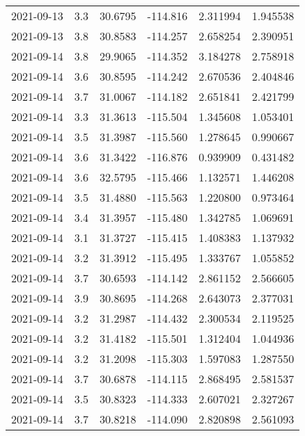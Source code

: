 \begin{tabular}{lrrrrr}
2021-09-13 &       3.3 &  30.6795 &  -114.816 &         2.311994 &         1.945538 \\
2021-09-13 &       3.8 &  30.8583 &  -114.257 &         2.658254 &         2.390951 \\
2021-09-14 &       3.8 &  29.9065 &  -114.352 &         3.184278 &         2.758918 \\
2021-09-14 &       3.6 &  30.8595 &  -114.242 &         2.670536 &         2.404846 \\
2021-09-14 &       3.7 &  31.0067 &  -114.182 &         2.651841 &         2.421799 \\
2021-09-14 &       3.3 &  31.3613 &  -115.504 &         1.345608 &         1.053401 \\
2021-09-14 &       3.5 &  31.3987 &  -115.560 &         1.278645 &         0.990667 \\
2021-09-14 &       3.6 &  31.3422 &  -116.876 &         0.939909 &         0.431482 \\
2021-09-14 &       3.6 &  32.5795 &  -115.466 &         1.132571 &         1.446208 \\
2021-09-14 &       3.5 &  31.4880 &  -115.563 &         1.220800 &         0.973464 \\
2021-09-14 &       3.4 &  31.3957 &  -115.480 &         1.342785 &         1.069691 \\
2021-09-14 &       3.1 &  31.3727 &  -115.415 &         1.408383 &         1.137932 \\
2021-09-14 &       3.2 &  31.3912 &  -115.495 &         1.333767 &         1.055852 \\
2021-09-14 &       3.7 &  30.6593 &  -114.142 &         2.861152 &         2.566605 \\
2021-09-14 &       3.9 &  30.8695 &  -114.268 &         2.643073 &         2.377031 \\
2021-09-14 &       3.2 &  31.2987 &  -114.432 &         2.300534 &         2.119525 \\
2021-09-14 &       3.2 &  31.4182 &  -115.501 &         1.312404 &         1.044936 \\
2021-09-14 &       3.2 &  31.2098 &  -115.303 &         1.597083 &         1.287550 \\
2021-09-14 &       3.7 &  30.6878 &  -114.115 &         2.868495 &         2.581537 \\
2021-09-14 &       3.5 &  30.8323 &  -114.333 &         2.607021 &         2.327267 \\
2021-09-14 &       3.7 &  30.8218 &  -114.090 &         2.820898 &         2.561093 \\

\end{tabular}
